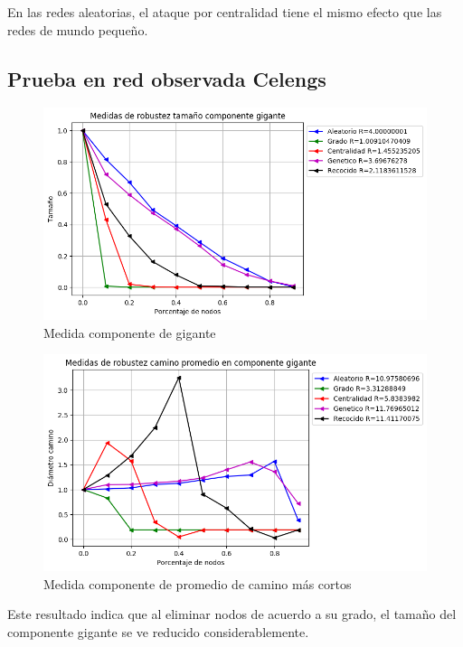En las redes aleatorias, el ataque por centralidad tiene el mismo efecto que las redes de mundo pequeño.


\subsection{Prueba en red observada Celengs}

\begin{figure}[H]
    \centering
    \includegraphics[scale=0.7]{Capitulo5Robustez/imagenes/grafica_GC20180508_020345Celengs.png}
    \caption{Medida componente de gigante}
\end{figure}


\begin{figure}[H]
    \centering
    \includegraphics[scale=0.7]{Capitulo5Robustez/imagenes/grafica_APL20180508_020345Celengs.png}
    \caption{Medida componente de promedio de camino más cortos}
\end{figure}


Este resultado indica que al eliminar nodos de acuerdo a su grado, el tamaño del componente gigante se ve reducido considerablemente.

